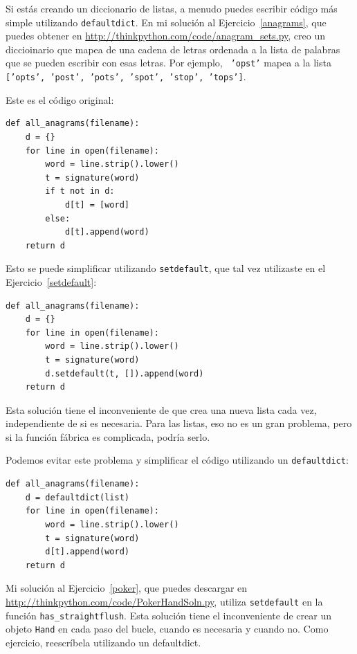 \documentclass[10pt]{book}
\begin{document}
Si estás creando un diccionario de listas, a menudo puedes escribir código
más simple utilizando {\tt defaultdict}.  En mi solución al
Ejercicio~\ref{anagrams}, que puedes obtener en
\url{http://thinkpython.com/code/anagram_sets.py}, creo un
diccioinario que mapea de una cadena de letras ordenada a la lista de
palabras que se pueden escribir con esas letras.  Por ejemplo, {\tt
  'opst'} mapea a la lista {\tt ['opts', 'post', 'pots', 'spot',
    'stop', 'tops']}.

Este es el código original:

\begin{verbatim}
def all_anagrams(filename):
    d = {}
    for line in open(filename):
        word = line.strip().lower()
        t = signature(word)
        if t not in d:
            d[t] = [word]
        else:
            d[t].append(word)
    return d
\end{verbatim}

Esto se puede simplificar utilizando {\tt setdefault}, que tal vez
utilizaste en el Ejercicio~\ref{setdefault}:

\begin{verbatim}
def all_anagrams(filename):
    d = {}
    for line in open(filename):
        word = line.strip().lower()
        t = signature(word)
        d.setdefault(t, []).append(word)
    return d
\end{verbatim}

Esta solución tiene el inconveniente de que crea una nueva lista
cada vez, independiente de si es necesaria.  Para las listas,
eso no es un gran problema, pero si la función
fábrica es complicada, podría serlo.

Podemos evitar este problema y
simplificar el código utilizando un {\tt defaultdict}:

\begin{verbatim}
def all_anagrams(filename):
    d = defaultdict(list)
    for line in open(filename):
        word = line.strip().lower()
        t = signature(word)
        d[t].append(word)
    return d
\end{verbatim}

Mi solución al Ejercicio~\ref{poker}, que puedes descargar en
\url{http://thinkpython.com/code/PokerHandSoln.py},
utiliza {\tt setdefault} en la función
\verb"has_straightflush".  Esta solución tiene el inconveniente de
crear un objeto {\tt Hand} en cada paso del bucle, cuando
es necesaria y cuando no.  Como ejercicio, reescríbela utilizando
un defaultdict.
\end{document}
